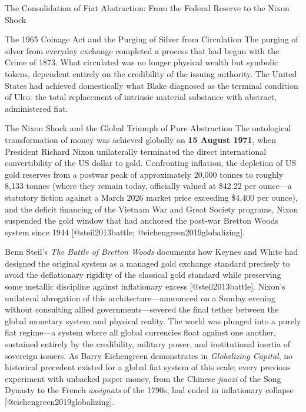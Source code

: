 \documentclass[
  ignorenonframetext,
]{beamer}
\begin{document}
\begin{frame}{The Consolidation of Fiat Abstraction: From the Federal
Reserve to the Nixon Shock}
\begin{block}{The 1965 Coinage Act and the Purging of Silver from
Circulation}
The purging of silver from everyday exchange completed a process that
had begun with the Crime of 1873. What circulated was no longer physical
wealth but symbolic tokens, dependent entirely on the credibility of the
issuing authority. The United States had achieved domestically what
Blake diagnosed as the terminal condition of Ulro: the total replacement
of intrinsic material substance with abstract, administered fiat.
\end{block}

\begin{block}{The Nixon Shock and the Global Triumph of Pure
Abstraction}
\protect{}\label{the-nixon-shock-and-the-global-triumph-of-pure-abstraction}
The ontological transformation of money was achieved globally on
\textbf{15 August 1971}, when President Richard Nixon unilaterally
terminated the direct international convertibility of the US dollar to
gold. Confronting inflation, the depletion of US gold reserves from a
postwar peak of approximately 20,000 tonnes to roughly 8,133 tonnes
(where they remain today, officially valued at \$42.22 per ounce---a
statutory fiction against a March 2026 market price exceeding \$4,400
per ounce), and the deficit financing of the Vietnam War and Great
Society programs, Nixon suspended the gold window that had anchored the
post-war Bretton Woods system since 1944 {[}@steil2013battle;
@eichengreen2019globalizing{]}.

Benn Steil's \emph{The Battle of Bretton Woods} documents how Keynes and
White had designed the original system as a managed gold exchange
standard precisely to avoid the deflationary rigidity of the classical
gold standard while preserving some metallic discipline against
inflationary excess {[}@steil2013battle{]}. Nixon's unilateral
abrogation of this architecture---announced on a Sunday evening without
consulting allied governments---severed the final tether between the
global monetary system and physical reality. The world was plunged into
a purely fiat regime---a system where all global currencies float
against one another, sustained entirely by the credibility, military
power, and institutional inertia of sovereign issuers. As Barry
Eichengreen demonstrates in \emph{Globalizing Capital}, no historical
precedent existed for a global fiat system of this scale; every previous
experiment with unbacked paper money, from the Chinese \emph{jiaozi} of
the Song Dynasty to the French \emph{assignats} of the 1790s, had ended
in inflationary collapse {[}@eichengreen2019globalizing{]}.


\end{block}
\end{frame}
\end{document}
